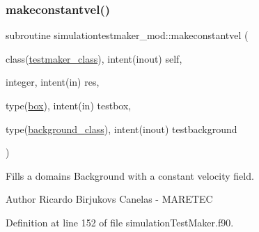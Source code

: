 \subsubsection{\texorpdfstring{makeconstantvel()}{makeconstantvel()}}
{\footnotesize\ttfamily subroutine simulationtestmaker\+\_\+mod\+::makeconstantvel (\begin{DoxyParamCaption}\item[{class(\mbox{\hyperlink{structsimulationtestmaker__mod_1_1testmaker__class}{testmaker\+\_\+class}}), intent(inout)}]{self,  }\item[{integer, intent(in)}]{res,  }\item[{type(\mbox{\hyperlink{structgeometry__mod_1_1box}{box}}), intent(in)}]{testbox,  }\item[{type(\mbox{\hyperlink{structbackground__mod_1_1background__class}{background\+\_\+class}}), intent(inout)}]{testbackground }\end{DoxyParamCaption})\hspace{0.3cm}{\ttfamily [private]}}



Fills a domain\textquotesingle{}s Background with a constant velocity field. 

\begin{DoxyAuthor}{Author}
Ricardo Birjukovs Canelas -\/ M\+A\+R\+E\+T\+EC 
\end{DoxyAuthor}


Definition at line 152 of file simulation\+Test\+Maker.\+f90.


